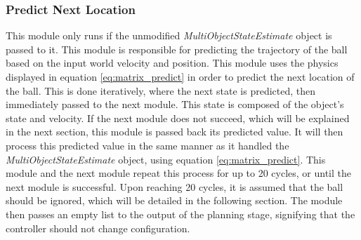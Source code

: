 \documentclass{article}
\begin{document}
\subsubsection*{Predict Next Location} \label{sec:predictnextlocation}
This module only runs if the unmodified \emph{MultiObjectStateEstimate} object is passed to it. This module is responsible for predicting the trajectory of the ball based on the input world velocity and position. This module uses the physics displayed in equation \ref{eq:matrix_predict} in order to predict the next location of the ball. This is done iteratively, where the next state is predicted, then immediately passed to the next module. This state is composed of the object's state and velocity. If the next module does not succeed, which will be explained in the next section, this module is passed back its predicted value. It will then process this predicted value in the same manner as it handled the \emph{MultiObjectStateEstimate} object, using equation \ref{eq:matrix_predict}. This module and the next module repeat this process for up to 20 cycles, or until the next module is successful. Upon reaching 20 cycles, it is assumed that the ball should be ignored, which will be detailed in the following section. The module then passes an empty list to the output of the planning stage, signifying that the controller should not change configuration.

\end{document}
